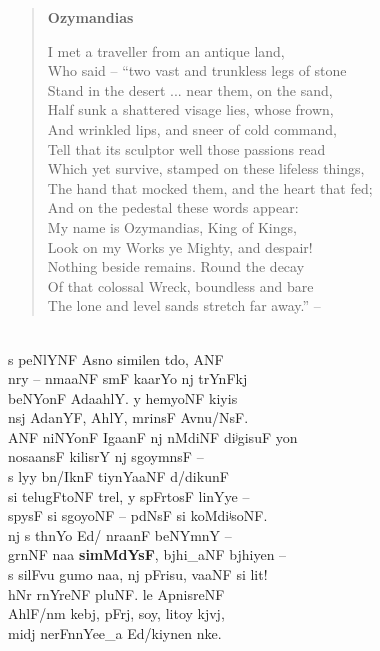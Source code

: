 \blockcquote{shelley:ozymandias}{
	\textbf{Ozymandias}\medskip

	I met a traveller from an antique land, \\
	Who said -- ``two vast and trunkless legs of stone \\
	Stand in the desert ... near them, on the sand, \\
	Half sunk a shattered visage lies, whose frown, \\
	And wrinkled lips, and sneer of cold command, \\
	Tell that its sculptor well those passions read \\
	Which yet survive, stamped on these lifeless things, \\
	The hand that mocked them, and the heart that fed; \\
	And on the pedestal these words appear: \\
	My name is Ozymandias, King of Kings, \\
	Look on my Works ye Mighty, and despair! \\
	Nothing beside remains. Round the decay \\
	Of that colossal Wreck, boundless and bare \\
	The lone and level sands stretch far away.'' -- \medskip \\
}

\begin{flushleft}
 \\

s peNlYNF Asno similen tdo, ANF \\
nry – nmaaNF smF kaarYo nj trYnFkj \\
beNYonF AdaahlY. y hemyoNF kiyis \\
nsj AdanYF, AhlY, mrinsF Avnu/NsF. \\
ANF niNYonF IgaanF nj nMdiNF diʲgisuF yon \\
nosaansF kilisrY nj sgoymnsF – \\
s lyy bn/IknF tiynYaaNF d/dikunF \\
si telugFtoNF trel, y spFrtosF linYye – \\
spysF si sgoyoNF – pdNsF si koMdiʲsoNF. \\
nj s thnYo Ed/ nraanF beNYmnY – \\
grnNF naa \textbf{simMdYsF}, bjhi\_aNF bjhiyen – \\
s silFvu gumo naa, nj pFrisu, vaaNF si lit! \\
hNr rnYreNF pluNF. le ApnisreNF \\
AhlF/nm kebj, pFrj, soy, litoy kjvj, \\
midj nerFnnYee\_a Ed/kiynen nke. \\
\end{flushleft}
\bigskip

